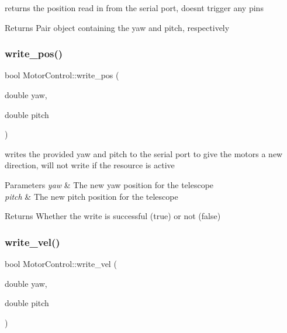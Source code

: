 returns the position read in from the serial port, doesn\textquotesingle{}t trigger any pins 

\begin{DoxyReturn}{Returns}
Pair object containing the yaw and pitch, respectively 
\end{DoxyReturn}
\mbox{\label{structMotorControl_a2027a3374ee4ec606901c77931226e30}} 
\subsubsection{\texorpdfstring{write\+\_\+pos()}{write\_pos()}}
{\footnotesize\ttfamily bool Motor\+Control\+::write\+\_\+pos (\begin{DoxyParamCaption}\item[{double}]{yaw,  }\item[{double}]{pitch }\end{DoxyParamCaption})}



writes the provided yaw and pitch to the serial port to give the motors a new direction, will not write if the resource is active 


\begin{DoxyParams}{Parameters}
{\em yaw} & The new yaw position for the telescope \\
\hline
{\em pitch} & The new pitch position for the telescope \\
\hline
\end{DoxyParams}
\begin{DoxyReturn}{Returns}
Whether the write is successful (true) or not (false) 
\end{DoxyReturn}
\mbox{\label{structMotorControl_ae5ed3793c1b3e6f982bf6806ecce3978}} 
\subsubsection{\texorpdfstring{write\+\_\+vel()}{write\_vel()}}
{\footnotesize\ttfamily bool Motor\+Control\+::write\+\_\+vel (\begin{DoxyParamCaption}\item[{double}]{yaw,  }\item[{double}]{pitch }\end{DoxyParamCaption})}




